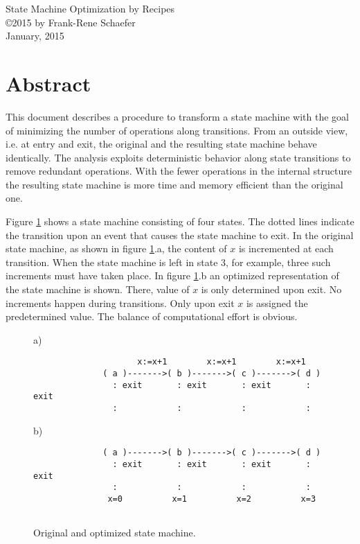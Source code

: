 \documentclass[12pt,a4paper]{scrartcl}
\begin{document}
\begin{center}
{\large State Machine Optimization by Recipes} \\ 
\copyright 2015 by Frank-Rene Schaefer         \\
January, 2015
\end{center}


%
\section{Abstract}

This document describes a procedure to transform a state machine with the goal
of minimizing the number of operations along transitions.  From an outside
view, i.e. at entry and exit, the original and the resulting state machine
behave identically.  The analysis exploits deterministic behavior along state
transitions to remove redundant operations.  With the fewer operations in the
internal structure the resulting state machine is more time and memory efficient
than the original one.  

Figure \ref{fig:two-state-machines} shows a state machine consisting of four
states.  The dotted lines indicate the transition upon an event that causes the
state machine to exit.  In the original state machine, as shown in figure
\ref{fig:two-state-machines}.a, the content of $x$ is incremented at each
transition. When the state machine is left in state 3, for example, three such
increments must have taken place. In figure \ref{fig:two-state-machines}.b an
optimized representation of the state machine is shown.  There, value of $x$ is
only determined upon exit.  No increments happen during transitions. Only upon
exit $x$ is assigned the predetermined value. The balance of computational
effort is obvious.

\begin{figure}[htbp] \leavevmode \label{fig:two-state-machines}
a)
\begin{verbatim}
                     x:=x+1        x:=x+1        x:=x+1
              ( a )------->( b )------->( c )------->( d )
                : exit       : exit       : exit       : exit
                :            :            :            :
\end{verbatim}
    
b)
\begin{verbatim}
              ( a )------->( b )------->( c )------->( d )
                : exit       : exit       : exit       : exit
                :            :            :            :
               x=0          x=1          x=2          x=3
    
\end{verbatim}
\caption{Original and optimized state machine.}
\end{figure}
                 
\end{document}
